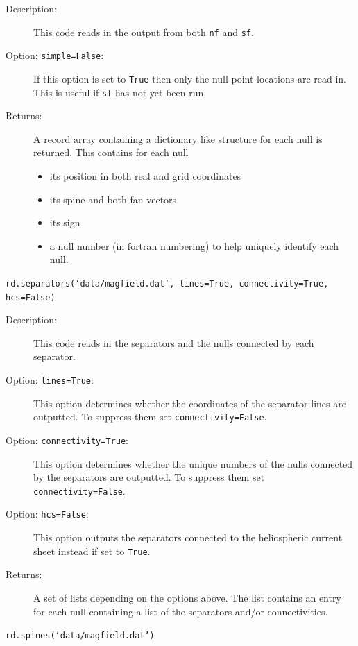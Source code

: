 \documentclass[12pt]{article}
\begin{document}
      \begin{description}
        \item [Description:] This code reads in the output from both \texttt{nf} and \texttt{sf}.
        \item [Option: \texttt{simple=False}:] If this option is set to \texttt{True} then only the null point locations are read in. This is useful if \texttt{sf} has not yet been run.
        \item [Returns:] A record array containing a dictionary like structure for each null is returned. This contains for each null
        \begin{itemize}
          \item its position in both real and grid coordinates
          \item its spine and both fan vectors
          \item its sign
          \item a null number (in fortran numbering) to help uniquely identify each null.
        \end{itemize}
      \end{description}

      \texttt{rd.separators(`data/magfield.dat', lines=True, connectivity=True, hcs=False)}

      \begin{description}
        \item [Description:] This code reads in the separators and the nulls connected by each separator.
        \item [Option: \texttt{lines=True}:] This option determines whether the coordinates of the separator lines are outputted. To suppress them set \texttt{connectivity=False}.
        \item [Option: \texttt{connectivity=True}:] This option determines whether the unique numbers of the nulls connected by the separators are outputted. To suppress them set \texttt{connectivity=False}.
        \item [Option: \texttt{hcs=False}:] This option outputs the separators connected to the heliospheric current sheet instead if set to \texttt{True}.
        \item [Returns:] A set of lists depending on the options above. The list contains an entry for each null containing a list of the separators and/or connectivities.
      \end{description}

      \texttt{rd.spines(`data/magfield.dat')}
\end{document}
